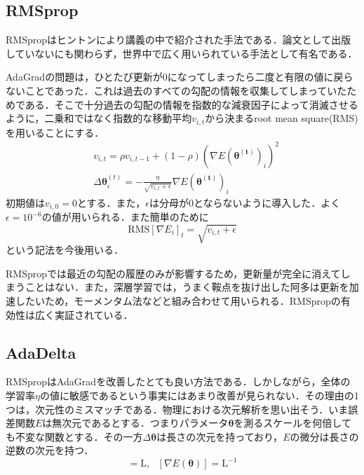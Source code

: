 \documentclass[a4paper,11pt]{jsreport}
\begin{document}
\subsection{RMSprop}
RMSpropはヒントンにより講義の中で紹介された手法である．論文として出版していないにも関わらず，世界中で広く用いられている手法として有名である．\par
AdaGradの問題は，ひとたび更新が$0$になってしまったら二度と有限の値に戻らないことであった．これは過去のすべての勾配の情報を収集してしまっていたためである．そこで十分過去の勾配の情報を指数的な減衰因子によって消滅させるように，二乗和ではなく指数的な移動平均$v_{i,t}$から決まるroot mean square(RMS)を用いることにする．
\begin{align}
   & v_{i,t}
  = \rho v_{i,t-1} + (1-\rho) (\nabla E(\bm{\theta^{(t)}})_i)^2 \\
   & \Delta \bm{\theta}_i^{(t)}
  = - \frac{\eta}{\sqrt{v_{i,t}+\epsilon}} \nabla E(\bm{\theta^{(t)}})_i
\end{align}
初期値は$v_{i,0}=0$とする．また，$\epsilon$は分母が$0$とならないように導入した．よく$\epsilon = 10^{-6}$の値が用いられる．また簡単のために
\begin{equation}
  \mathrm{RMS}[\nabla E_i]_t = \sqrt{v_{i,t} + \epsilon}
\end{equation}
という記法を今後用いる．\par
RMSpropでは最近の勾配の履歴のみが影響するため，更新量が完全に消えてしまうことはない．また，深層学習では，うまく鞍点を抜け出した阿多は更新を加速したいため，モーメンタム法などと組み合わせて用いられる．RMSpropの有効性は広く実証されている．

\subsection{AdaDelta}
RMSpropはAdaGradを改善したとても良い方法である．しかしながら，全体の学習率$\eta$の値に敏感であるという事実にはあまり改善が見られない．その理由の1つは，次元性のミスマッチである．物理における次元解析を思い出そう．いま誤差関数$E$は無次元であるとする．つまりパラメータ$\bm{\theta}$を測るスケールを何倍しても不変な関数とする．その一方$\Delta \bm{\theta}$は長さの次元を持っており，$E$の微分は長さの逆数の次元を持つ．
\begin{equation}
  [\Delta \bm{\theta}] = \mathrm{L}, \ \ \ [\nabla E(\bm{\theta})] = \mathrm{L}^{-1}
\end{equation}
\end{document}
